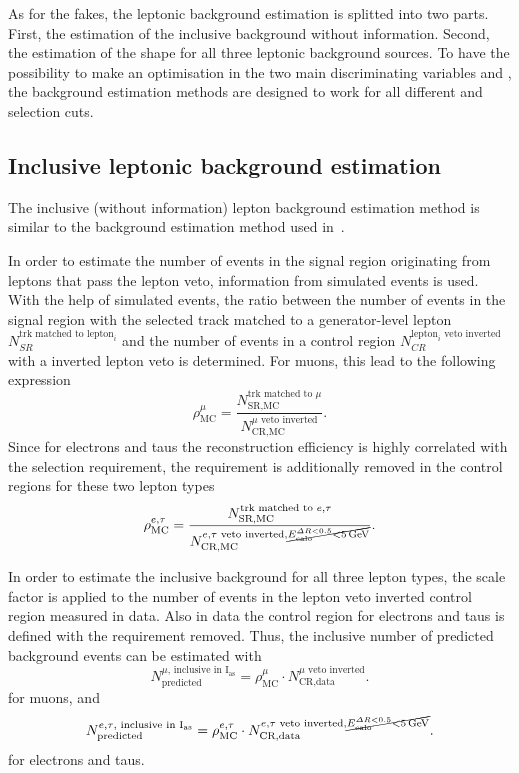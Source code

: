 As for the fakes, the leptonic background estimation is splitted into two parts.
First, the estimation of the inclusive background without \ias information.
Second, the estimation of the \ias shape for all three leptonic background sources.
To have the possibility to make an optimisation in the two main discriminating variables \pt and \ias, the background estimation methods are designed to work for all different \pt and \ias selection cuts.

\FloatBarrier
\subsection{Inclusive leptonic background estimation}
The inclusive (without \dedx information) lepton background estimation method is similar to the background estimation method used in~\cite{bib:CMS:DT_Thesis,bib:CMS:DT_8TeV_AN}.

In order to estimate the number of events in the signal region originating from leptons that pass the lepton veto, information from simulated events is used.
With the help of simulated \WJets events, the ratio \leptonscalefactor between the number of events in the signal region with the selected track matched to a generator-level lepton $N_{SR}^{\text{trk matched to lepton}_i}$
 and the number of events in a control region $N_{CR}^{\text{lepton}_i\text{ veto inverted}}$ with a inverted lepton veto is determined.
For muons, this lead to the following expression
\begin{equation}
\rho_{\text{MC}}^{\mu} = \frac{N_{\text{SR,MC}}^{\text{trk matched to }\mu}}{N_{\text{CR,MC}}^{\mu \text{ veto inverted}}}.
\end{equation}
Since for electrons and taus the reconstruction efficiency is highly correlated with the \ecalo selection requirement, the \ecalo requirement is additionally removed in the control regions for these two lepton types 
\begin{equation}
\rho_{\text{MC}}^{e,\tau} = \frac{N_{\text{SR,MC}}^{\text{trk matched to }e,\tau}}{N_{\text{CR,MC}}^{e,\tau\text{ veto inverted}, \cancel{E^{\Delta R<0.5}_{\text{calo}}<5\,\text{Ge}\kern-0.06667em\text{V}}}}.
\end{equation}

In order to estimate the inclusive background for all three lepton types, the scale factor \leptonscalefactor is applied to the number of events in the lepton veto inverted control region measured in data.
Also in data the control region for electrons and taus is defined with the \ecalo requirement removed. 
Thus, the inclusive number of predicted background events can be estimated with  
\begin{equation}
N^{\mu \text{, inclusive in I$_{\text{as}}$}}_{\text{predicted}} = \rho_{\text{MC}}^{\mu} \cdot N_{\text{CR,data}}^{\mu\text{ veto inverted}}.
\end{equation}
for muons, and 
\begin{equation}
N^{e,\tau\text{, inclusive in I$_{\text{as}}$}}_{\text{predicted}} = \rho_{\text{MC}}^{e,\tau} \cdot N_{\text{CR,data}}^{e,\tau\text{ veto inverted}, \cancel{E^{\Delta R<0.5}_{\text{calo}}<5\,\text{Ge}\kern-0.06667em\text{V}}}.
\end{equation}
for electrons and taus.

